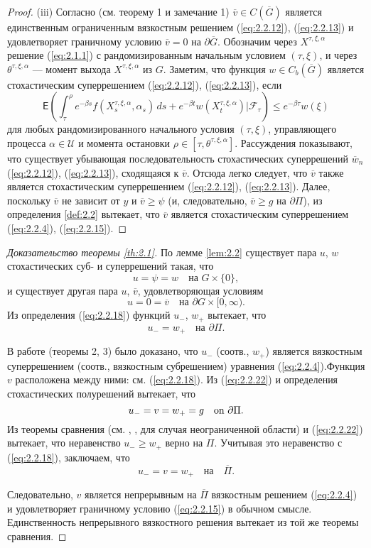 \begin{proof}
(iii) Согласно \cite{Rok14} (см. теорему 1 и замечание 1) $\overline v\in C(\overline G)$ является единственным ограниченным вязкостным решением (\ref{eq:2.2.12}), (\ref{eq:2.2.13}) и удовлетворяет граничному условию $\overline v=0$ на $\partial\overline G$. Обозначим через $X^{\tau,\xi,\alpha}$ решение (\ref{eq:2.1.1}) с рандомизированным начальным условием $(\tau,\xi)$, и через $\theta^{\tau,\xi,\alpha}$ --- момент выхода $X^{\tau,\xi,\alpha}$ из $G$. Заметим, что функция $w\in C_b(\overline G)$ является стохастическим суперрешением (\ref{eq:2.2.12}), (\ref{eq:2.2.13}), если
$$ \mathsf E\left(\int_\tau^\rho e^{-\beta s} f(X^{\tau,\xi,\alpha}_s,\alpha_s)\,ds +e^{-\beta t} w(X^{\tau,\xi,\alpha}_t)\biggr|\mathscr F_\tau\right)\le e^{-\beta\tau}w(\xi)$$
для любых рандомизированного начального условия $(\tau,\xi)$, управляющего процесса $\alpha\in\mathcal U$ и момента остановки $\rho\in [\tau,\theta^{\tau,\xi,\alpha}]$.
Рассуждения \cite{Rok14} показывают, что существует убывающая последовательность стохастических суперрешений $\overline w_n$  (\ref{eq:2.2.12}), (\ref{eq:2.2.13}), сходящаяся к $\overline v$. Отсюда легко следует, что $\overline v$ также является стохастическим суперрешением (\ref{eq:2.2.12}), (\ref{eq:2.2.13}). Далее, поскольку $\overline v$ не зависит от $y$ и $\overline v\ge\psi$ (и, следовательно, $\overline v\ge g$ на $\partial\Pi$), из определения \ref{def:2.2} вытекает, что $\overline v$ является стохастическим суперрешением (\ref{eq:2.2.4}), (\ref{eq:2.2.15}).
\end{proof}

\begin{proof}[Доказательство теоремы \ref{th:2.1}]
По лемме \ref{lem:2.2} существует пара $u$, $w$ стохастических суб- и суперрешений такая, что
$$ u=\psi=w\quad \textrm{на } G\times\{0\},$$
и существует другая пара $u$, $\overline v$, удовлетворяющая условиям
$$ u=0=\overline v\quad \textrm{на } \partial G\times [0,\infty).$$
Из определения (\ref{eq:2.2.18}) функций $u_-$, $w_+$ вытекает, что
\begin{equation} \label{eq:2.2.22}
u_- =w_+\quad \textrm{на } \partial\Pi.
\end{equation}

В работе \cite{Rok14} (теоремы 2, 3) было доказано, что $u_-$ (соотв., $w_+$) является вязкостным суперрешением (соотв., вязкостным субрешением) уравнения (\ref{eq:2.2.4}).Функция $v$ расположена между ними: см. (\ref{eq:2.2.18}). Из (\ref{eq:2.2.22}) и определения стохастических полурешений вытекает, что
$$u_- =v= w_+=g\quad\textnormal{on } \partial\Pi.$$
Из теоремы сравнения (см. \cite[теорема 7.3]{Ish89}, \cite[теорема 4.2]{MotSar08a}, \cite[теорема 6.21]{Tou13} для случая неограниченной области) и (\ref{eq:2.2.22}) вытекает, что неравенство $u_- \ge w_+$ верно на $\Pi$. Учитывая это неравенство с (\ref{eq:2.2.18}), заключаем, что
$$u_-=v=w_+ \quad \textrm{на} \quad \overline{\Pi}.$$

Следовательно, $v$ является непрерывным на $\overline\Pi$ вязкостным решением (\ref{eq:2.2.4}) и удовлетворяет граничному условию (\ref{eq:2.2.15}) в обычном смысле. Единственность непрерывного вязкостного решения вытекает из той же теоремы сравнения.
\end{proof}


